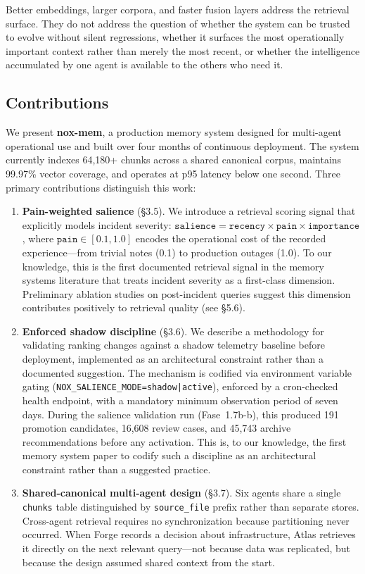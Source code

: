 \documentclass{article}
\begin{document}
Better embeddings, larger corpora, and faster fusion layers address the retrieval surface.
They do not address the question of whether the system can be trusted to evolve without
silent regressions, whether it surfaces the most operationally important context rather
than merely the most recent, or whether the intelligence accumulated by one agent is
available to the others who need it.

\subsection{Contributions}

We present \textbf{nox-mem}, a production memory system designed for multi-agent
operational use and built over four months of continuous deployment. The system currently
indexes 64,180+ chunks across a shared canonical corpus, maintains 99.97\% vector
coverage, and operates at p95 latency below one second. Three primary contributions
distinguish this work:

\begin{enumerate}

\item \textbf{Pain-weighted salience} (\S3.5). We introduce a retrieval scoring signal
that explicitly models incident severity:
$\texttt{salience} = \texttt{recency} \times \texttt{pain} \times \texttt{importance}$,
where $\texttt{pain} \in [0.1, 1.0]$ encodes the operational cost of the recorded
experience---from trivial notes (0.1) to production outages (1.0). To our knowledge, this
is the first documented retrieval signal in the memory systems literature that treats
incident severity as a first-class dimension. Preliminary ablation studies on post-incident
queries suggest this dimension contributes positively to retrieval quality (see \S5.6).

\item \textbf{Enforced shadow discipline} (\S3.6). We describe a methodology for
validating ranking changes against a shadow telemetry baseline before deployment,
implemented as an architectural constraint rather than a documented suggestion. The
mechanism is codified via environment variable gating
(\texttt{NOX\_SALIENCE\_MODE=shadow|active}), enforced by a cron-checked health endpoint,
with a mandatory minimum observation period of seven days. During the salience validation
run (Fase~1.7b-b), this produced 191 promotion candidates, 16,608 review cases, and
45,743 archive recommendations before any activation. This is, to our knowledge, the first
memory system paper to codify such a discipline as an architectural constraint rather than
a suggested practice.

\item \textbf{Shared-canonical multi-agent design} (\S3.7). Six agents share a single
\texttt{chunks} table distinguished by \texttt{source\_file} prefix rather than separate
stores. Cross-agent retrieval requires no synchronization because partitioning never
occurred. When Forge records a decision about infrastructure, Atlas retrieves it directly
on the next relevant query---not because data was replicated, but because the design
assumed shared context from the start.

\end{enumerate}
\end{document}
